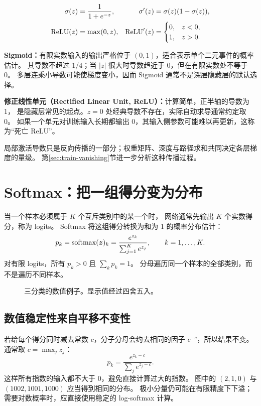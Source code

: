 \begin{align}
 \sigma(z)&=\frac{1}{1+e^{-z}}, & \sigma'(z)&=\sigma(z)(1-\sigma(z)),\label{eq:sigmoid}\\
 \operatorname{ReLU}(z)&=\max(0,z), & \operatorname{ReLU}'(z)&=
 \begin{cases}0,&z<0,\\1,&z>0.\end{cases}\label{eq:relu}
\end{align}

\textbf{Sigmoid：}有限实数输入的输出严格位于 $(0,1)$，适合表示单个二元事件的概率估计。
其导数不超过 $1/4$；当 $|z|$ 很大时导数趋近于 0，但在有限实数处不等于 0。
多层连乘小导数可能使梯度变小，因而 Sigmoid 通常不是深层隐藏层的默认选择。

\textbf{修正线性单元（Rectified Linear Unit, ReLU）：}计算简单，正半轴的导数为 1，
是隐藏层常见的起点。$z=0$ 处经典导数不存在，实际自动求导通常约定取 0。
如果一个单元对训练输入长期都输出 0，其输入侧参数可能难以再更新，这称为“死亡 ReLU”。

局部激活导数只是反向传播的一部分；权重矩阵、深度与路径求和共同决定各层梯度的量级。
第\ref{sec:train-vanishing}节进一步分析这种传播过程。


\section{Softmax：把一组得分变为分布}
\label{sec:nn-softmax}

当一个样本必须属于 $K$ 个互斥类别中的某一个时，
网络通常先输出 $K$ 个实数得分，称为 logits。
Softmax 将这组得分转换为和为 1 的概率分布估计：
\begin{equation}
 p_k=\operatorname{softmax}(\boldsymbol{z})_k=\frac{e^{z_k}}{\sum_{j=1}^K e^{z_j}},
 \qquad k=1,\ldots,K.
 \label{eq:softmax}
\end{equation}
对有限 logits，所有 $p_k>0$ 且 $\sum_k p_k=1$。
分母遍历同一个样本的全部类别，而不是遍历不同样本。

\begin{figure}[htbp]
\centering

\caption{三分类的数值例子。显示值经过四舍五入。}
\label{fig:softmax}
\par\smallskip
{}
\end{figure}

\subsection{数值稳定性来自平移不变性}
若给每个得分同时减去常数 $c$，分子分母会约去相同的因子 $e^{-c}$，所以结果不变。
通常取 $c=\max_j z_j$：
\begin{equation}
 p_k=\frac{e^{z_k-c}}{\sum_j e^{z_j-c}}.
 \label{eq:stable-softmax}
\end{equation}
这样所有指数的输入都不大于 0，避免直接计算过大的指数。
图中的 $(2,1,0)$ 与 $(1002,1001,1000)$ 应当得到相同的分布。
极小分量仍可能在有限精度下下溢；需要对数概率时，应直接使用稳定的 log-softmax 计算。

